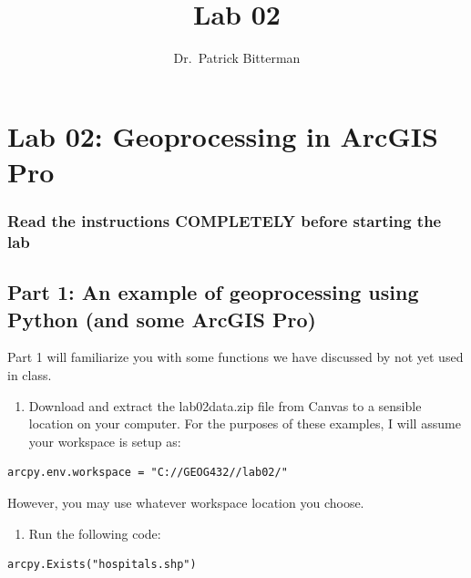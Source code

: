 \documentclass[]{article}
\title{Lab 02}
\author{Dr.~Patrick Bitterman}
\date{}
\makeatletter
\providecommand{\tightlist}{%
  \setlength{\itemsep}{0pt}\setlength{\parskip}{0pt}}
\renewcommand{\maketitle}{\bgroup\vspace*{-1cm}\setlength{\parindent}{0pt}
\begin{flushleft}
  \@author
  
  \@date
  
\end{flushleft}\egroup
}
\makeatother
\begin{document}
\maketitle

\hypertarget{lab-02-geoprocessing-in-arcgis-pro}{%
\section{Lab 02: Geoprocessing in ArcGIS
Pro}\label{lab-02-geoprocessing-in-arcgis-pro}}

\hypertarget{read-the-instructions-completely-before-starting-the-lab}{%
\subsubsection{Read the instructions COMPLETELY before starting the
lab}\label{read-the-instructions-completely-before-starting-the-lab}}

\hypertarget{part-1-an-example-of-geoprocessing-using-python-and-some-arcgis-pro}{%
\subsection{Part 1: An example of geoprocessing using Python (and some
ArcGIS
Pro)}\label{part-1-an-example-of-geoprocessing-using-python-and-some-arcgis-pro}}

Part 1 will familiarize you with some functions we have discussed by not
yet used in class.

\begin{enumerate}
\def\labelenumi{\arabic{enumi}.}
\tightlist
\item
  Download and extract the lab02data.zip file from Canvas to a sensible
  location on your computer. For the purposes of these examples, I will
  assume your workspace is setup as:
\end{enumerate}

\begin{verbatim}
arcpy.env.workspace = "C://GEOG432//lab02/"
\end{verbatim}

However, you may use whatever workspace location you choose.

\begin{enumerate}
\def\labelenumi{\arabic{enumi}.}
\tightlist
\item
  Run the following code:
\end{enumerate}

\begin{verbatim}
arcpy.Exists("hospitals.shp")
\end{verbatim}
\end{document}
